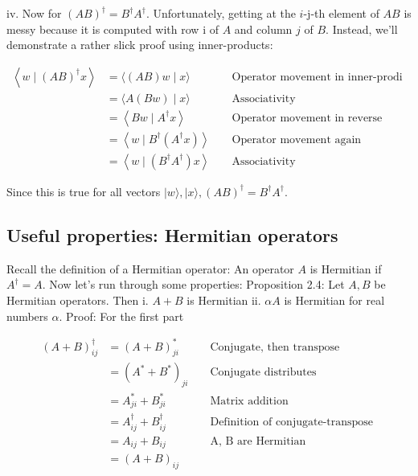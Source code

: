 \documentclass[main.tex]{subfiles}
\begin{document}
    iv. Now for $(A B)^{\dagger}=B^{\dagger} A^{\dagger}$. Unfortunately, getting at the $i$-j-th element of $A B$ is messy because it is computed with row i of $A$ and column $j$ of $B$. Instead, we'll demonstrate a rather slick proof using inner-products:
    
    $$
    \begin{aligned}
    \left\langle w \mid(A B)^{\dagger} x\right\rangle &=\langle(A B) w \mid x\rangle & & \text { Operator movement in inner-prodi } \\
    &=\langle A(B w) \mid x\rangle & & \text { Associativity } \\
    &=\left\langle B w \mid A^{\dagger} x\right\rangle & & \text { Operator movement in reverse } \\
    &=\left\langle w \mid B^{\dagger}\left(A^{\dagger} x\right)\right\rangle & & \text { Operator movement again } \\
    &=\left\langle w \mid\left(B^{\dagger} A^{\dagger}\right) x\right\rangle & & \text { Associativity }
    \end{aligned}
    $$
    
    Since this is true for all vectors $|w\rangle,|x\rangle,(A B)^{\dagger}=B^{\dagger} A^{\dagger}$.

\subsection{Useful properties: Hermitian operators}

    Recall the definition of a Hermitian operator: An operator $A$ is Hermitian if $A^{\dagger}=A$. Now let's run through some properties: Proposition 2.4: Let $A, B$ be Hermitian operators. Then i. $A+B$ is Hermitian ii. $\alpha A$ is Hermitian for real numbers $\alpha$. Proof: For the first part
    
    $$
    \begin{aligned}
    (A+B)_{i j}^{\dagger} &=(A+B)_{j i}^{*} & & \text { Conjugate, then transpose } \\
    &=\left(A^{*}+B^{*}\right)_{j i} & & \text { Conjugate distributes } \\
    &=A_{j i}^{*}+B_{j i}^{*} & & \text { Matrix addition } \\
    &=A_{i j}^{\dagger}+B_{i j}^{\dagger} & & \text { Definition of conjugate-transpose } \\
    &=A_{i j}+B_{i j} & & \text { A, B are Hermitian } \\
    &=(A+B)_{i j} & &
    \end{aligned}
    $$
    
\end{document}
